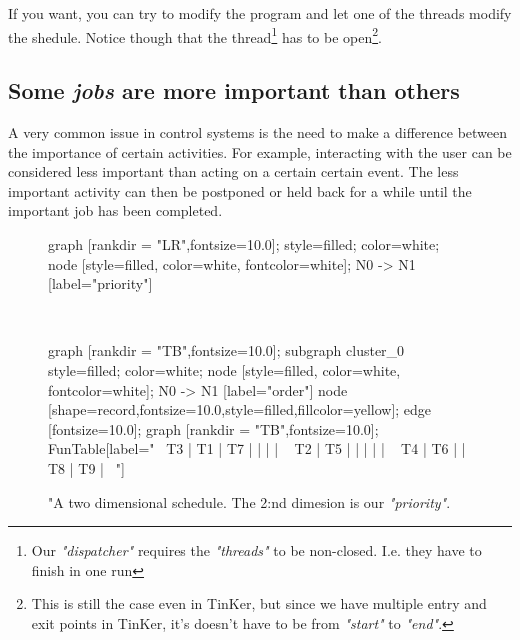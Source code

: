 	If you want, you can try to modify the program and let one of the threads modify the shedule. Notice though that the thread\footnote{Our \textit{"dispatcher"} requires the \textit{"threads"} to be non-closed. I.e. they have to finish in one run} has to be open\footnote{This is still the case even in TinKer, but since we have multiple entry and exit points in TinKer, it's doesn't have to be from \textit{"start"} to \textit{"end"}.}.

\subsection{Some \textit{jobs} are more important than others}
A very common issue in control systems is the need to make a difference between the importance of certain activities. For example, interacting with the user can be considered less important than acting on a certain certain event. The less important activity can then be postponed or held back for a while until the important job has been completed.
	
	\begin{figure}[!hbp]
	\begin{dotpic}
		graph [rankdir = "LR",fontsize=10.0];		
		style=filled;
		color=white;
		node [style=filled, color=white, fontcolor=white];
		N0 -> N1 [label="priority"]
	\end{dotpic}
\\
	\begin{dotpic}
		graph [rankdir = "TB",fontsize=10.0];
		subgraph cluster_0 {
			style=filled;
			color=white;
			node [style=filled, color=white, fontcolor=white];
			N0 -> N1 [label="order"]
		}
		node [shape=record,fontsize=10.0,style=filled,fillcolor=yellow];
		edge [fontsize=10.0];
		graph [rankdir = "TB",fontsize=10.0];
		FunTable[label="\
			{ T3    |   T1  |   T7  | \> |       |       } | \
			{ T2    |  T5   | \> |       |       |       } | \
			{ T4    |  T6   |       | T8    | T9    | \> } \
		"]
	
	\end{dotpic}
	\caption{"A two dimensional schedule. The 2:nd dimesion is our \textit{"priority"}.\label{FunTable3}}	
	\end{figure}


